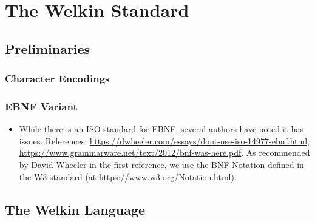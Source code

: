 
\chapter{The Welkin Standard}

\section{Preliminaries}

\subsection{Character Encodings}

\subsection{EBNF Variant}
\begin{itemize}
	\item While there is an ISO standard for EBNF, several authors have noted it has issues. References: \url{https://dwheeler.com/essays/dont-use-iso-14977-ebnf.html}, \url{https://www.grammarware.net/text/2012/bnf-was-here.pdf}. As recommended by David Wheeler in the first reference, we use the BNF Notation defined in the W3 standard (at \url{https://www.w3.org/Notation.html}).
\end{itemize}
\section{The Welkin Language}

